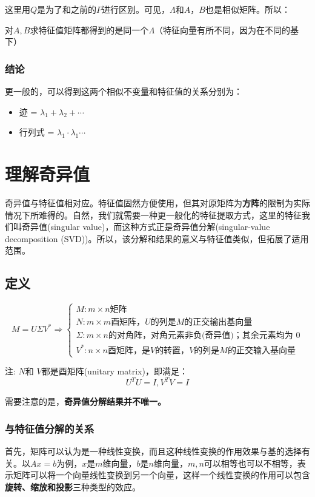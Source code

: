 \documentclass[12pt]{article}
\begin{document}
这里用$Q$是为了和之前的$P$进行区别。可见，$\Lambda$和$A$，$B$也是相似矩阵。所以：

对$A,B$求特征值矩阵都得到的是同一个$\Lambda$（特征向量有所不同，因为在不同的基下）

\subsubsection{结论}
更一般的，可以得到这两个相似不变量和特征值的关系分别为：
\begin{itemize}
    \item 迹 = $\lambda_1 + \lambda_2 + \cdots$
    \item 行列式 = $\lambda_1\cdot\lambda_1\cdots$
\end{itemize}


\section{理解奇异值\cite{How_To_Understand_Singular_Value}}
奇异值与特征值相对应。特征值固然方便使用，但其对原矩阵为\textbf{方阵}的限制为实际情况下所难得的。自然，我们就需要一种更一般化的特征提取方式，这里的特征我们叫奇异值(singular value)，而这种方式正是奇异值分解(singular-value decomposition (SVD))。所以，该分解和结果的意义与特征值类似，但拓展了适用范围\cite{Eigen_Value_And_Sigular_Value}。

\subsection{定义}
$$
M = U\Sigma V^* \Rightarrow 
\begin{cases}
M: m\times n\text{矩阵} \\
N: m\times m\text{酉矩阵，} U\text{的列是}M\text{的正交}\textbf{输出}\text{基向量}\\
\Sigma: m\times n\text{的对角阵，对角元素非负(奇异值)；其余元素均为 0} \\
V^*: n\times n\text{酉矩阵，是}V \text{的转置，}V\text{的列是}M\text{的正交}\textbf{输入}\text{基向量}
\end{cases}
$$

注: $N$和 $V$都是酉矩阵(unitary matrix)，即满足：
$$
U^TU = I, V^TV = I
$$

需要注意的是，\textbf{奇异值分解结果并不唯一。}

\subsubsection{与特征值分解的关系\cite{Eigen_Value_And_Sigular_Value_Relation}}
首先，矩阵可以认为是一种线性变换，而且这种线性变换的作用效果与基的选择有关。以$Ax = b$为例，$x$是$m$维向量，$b$是$n$维向量，$m,n$可以相等也可以不相等，表示矩阵可以将一个向量线性变换到另一个向量，这样一个线性变换的作用可以包含\textbf{旋转、缩放和投影}三种类型的效应。
\end{document}
